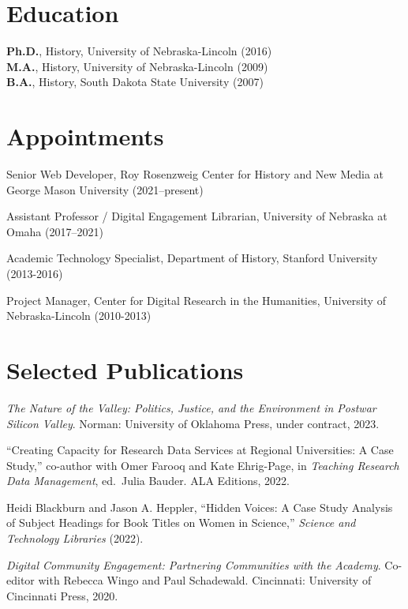 \hypertarget{education}{%
\section{Education}\label{education}}

\textbf{Ph.D.}, History, University of Nebraska-Lincoln (2016)\\
\textbf{M.A.}, History, University of Nebraska-Lincoln (2009)\\
\textbf{B.A.}, History, South Dakota State University (2007)

\hypertarget{appointments}{%
\section{Appointments}\label{appointments}}

Senior Web Developer, Roy Rosenzweig Center for History and New Media at
George Mason University (2021--present)

Assistant Professor / Digital Engagement Librarian, University of
Nebraska at Omaha (2017--2021)

Academic Technology Specialist, Department of History, Stanford
University (2013-2016)

Project Manager, Center for Digital Research in the Humanities,
University of Nebraska-Lincoln (2010-2013)

\hypertarget{selected-publications}{%
\section{Selected Publications}\label{selected-publications}}

\emph{The Nature of the Valley: Politics, Justice, and the Environment
in Postwar Silicon Valley}. Norman: University of Oklahoma Press, under
contract, 2023.

``Creating Capacity for Research Data Services at Regional Universities:
A Case Study,'' co-author with Omer Farooq and Kate Ehrig-Page, in
\emph{Teaching Research Data Management}, ed.~Julia Bauder. ALA
Editions, 2022.

Heidi Blackburn and Jason A. Heppler, ``Hidden Voices: A Case Study
Analysis of Subject Headings for Book Titles on Women in Science,''
\emph{Science and Technology Libraries} (2022).

\emph{Digital Community Engagement: Partnering Communities with the
Academy}. Co-editor with Rebecca Wingo and Paul Schadewald. Cincinnati:
University of Cincinnati Press, 2020.

